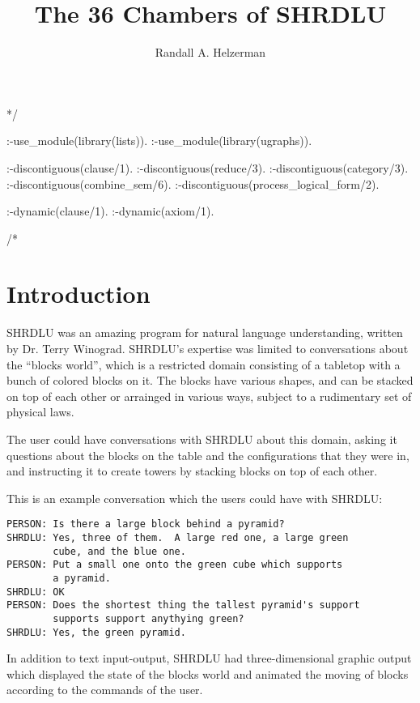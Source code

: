 \documentclass{book}[9pt]
\newenvironment{code}%
{\small \verbatim}%
{\endverbatim \large}
\begin{document}
\author{Randall A. Helzerman}
\title{The 36 Chambers of SHRDLU}
\maketitle

\frontmatter



\begin{code}
*/

:-use_module(library(lists)).
:-use_module(library(ugraphs)).

:-discontiguous(clause/1).
:-discontiguous(reduce/3).
:-discontiguous(category/3).
:-discontiguous(combine_sem/6).
:-discontiguous(process_logical_form/2).

:-dynamic(clause/1).
:-dynamic(axiom/1).

/*
\end{code}

\tableofcontents

\mainmatter

\chapter{Introduction}

SHRDLU was an amazing program for natural language understanding,
written by Dr. Terry Winograd.  SHRDLU's expertise was limited to
conversations about the ``blocks world'', which is a restricted domain
consisting of a tabletop with a bunch of colored blocks on it.  The
blocks have various shapes, and can be stacked on top of each other or
arrainged in various ways, subject to a rudimentary set of physical
laws.

The user could have conversations with SHRDLU about this domain,
asking it questions about the blocks on the table and the
configurations that they were in, and instructing it to create towers
by stacking blocks on top of each other.

This is an example conversation which the users could have with 
SHRDLU:
\begin{verbatim}
PERSON: Is there a large block behind a pyramid?
SHRDLU: Yes, three of them.  A large red one, a large green 
        cube, and the blue one.
PERSON: Put a small one onto the green cube which supports 
        a pyramid.
SHRDLU: OK
PERSON: Does the shortest thing the tallest pyramid's support 
        supports support anythying green?
SHRDLU: Yes, the green pyramid.
\end{verbatim}
\noindent In addition to text input-output, SHRDLU had
three-dimensional graphic output which displayed the state of the
blocks world and animated the moving of blocks according to the
commands of the user.
\end{document}
